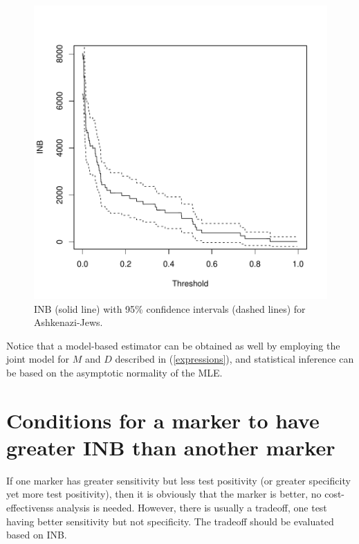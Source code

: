 \documentclass[11pt]{article}
\begin{document}
\begin{figure}
\begin{center}
\includegraphics{CostEff1timeScreen-fig3}
\end{center}
\label{fig:three}
\caption{INB (solid line) with 95\% confidence intervals (dashed lines) for Ashkenazi-Jews.}
\end{figure}


Notice that a model-based estimator can be obtained as well by employing the joint model for $M$ and $D$ described in (\ref{expressions}), and statistical inference can be based on the asymptotic normality of the MLE.







\section{Conditions for a marker to have greater INB than another marker}

If one marker has greater sensitivity but less test positivity (or greater specificity yet more test positivity), then it is obviously that the marker is better, no cost-effectivenss analysis is needed.  However, there is usually a tradeoff, one test having better sensitivity but not specificity.  The tradeoff should be evaluated based on INB.
\end{document}
